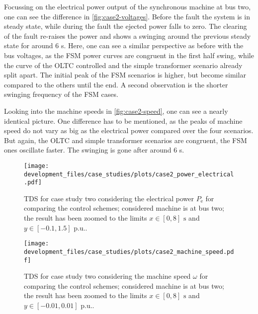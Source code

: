 Focussing on the electrical power output of the synchronous machine at bus two, one can see the difference in \autoref{fig:case2-voltages}.
Before the fault the system is in steady state, while during the fault the ejected power falls to zero.
The clearing of the fault re-raises the power and shows a swinging around the previous steady state for around $6$ s.
Here, one can see a similar perspective as before with the bus voltages, as the \acs{FSM} power curves are congruent in the first half swing, while the curve of the \acs{OLTC} controlled and the simple transformer scenario already split apart.
The initial peak of the \acs{FSM} scenarios is higher, but become similar compared to the others until the end.
A second observation is the shorter swinging frequency of the \acs{FSM} cases.

Looking into the machine speeds in \autoref{fig:case2-speed}, one can see a nearly identical picture.
One difference has to be mentioned, as the peaks of machine speed do not vary as big as the electrical power compared over the four scenarios.
But again, the \acs{OLTC} and simple transformer scenarios are congruent, the \acs{FSM} ones oscillate faster.
The swinging is gone after around $6$ s.

\begin{figure}[htbp!]
    \centering
    \texttt{[image: development\_files/case\_studies/plots/case2\_power\_electrical.pdf]}
    \caption[\acs{TDS} for case study two considering the electrical power]{\acs{TDS} for case study two considering the electrical power $P_\mathrm{e}$ for comparing the control schemes; considered machine is at bus two; the result has been zoomed to the limits $x \in [0,8]\text{ s}$ and $y \in [-0.1,1.5]\text{ p.u.}$.}
    \label{fig:case2-power}
\end{figure}

\begin{figure}[htbp!]
    \centering
    \texttt{[image: development\_files/case\_studies/plots/case2\_machine\_speed.pdf]}
    \caption[\acs{TDS} for case study two considering the machine speed]{\acs{TDS} for case study two considering the machine speed $\omega$ for comparing the control schemes; considered machine is at bus two; the result has been zoomed to the limits $x \in [0,8]\text{ s}$ and $y \in [-0.01,0.01]\text{ p.u.}$.}
    \label{fig:case2-speed}
\end{figure}

